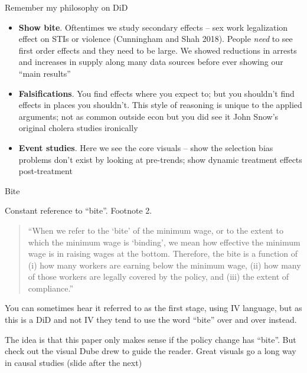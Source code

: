 \documentclass{beamer}
\begin{document}
\begin{frame}{Remember my philosophy on DiD}

\begin{itemize}
\item \textbf{Show bite}. Oftentimes we study secondary effects -- sex work legalization effect on STIs or violence (Cunningham and Shah 2018). People \emph{need} to see first order effects and they need to be large. We showed reductions in arrests and increases in supply along many data sources before ever showing our ``main results''
\item \textbf{Falsifications}. You find effects where you expect to; but you shouldn't find effects in places you shouldn't. This style of reasoning is unique to the applied arguments; not as common outside econ but you did see it John Snow's original cholera studies ironically
\item \textbf{Event studies}. Here we see the core visuals -- show the selection bias problems don't exist by looking at pre-trends; show dynamic treatment effects post-treatment
\end{itemize}

\end{frame}

\begin{frame}{Bite}

Constant reference to ``bite''.  Footnote 2.

\bigskip

\begin{quote}
``When we refer to the `bite' of the minimum wage, or to the extent to which the minimum wage is `binding', we mean how effective the minimum wage is in raising wages at the bottom.  Therefore, the bite is a function of (i) how many workers are earning below the minimum wage, (ii) how many of those workers are legally covered by the policy, and (iii) the extent of compliance.''
\end{quote}

\bigskip

You can sometimes hear it referred to as the first stage, using IV language, but as this is a DiD and not IV they tend to use the word ``bite'' over and over instead.

\bigskip

The idea is that this paper only makes sense if the policy change has ``bite''. But check out the visual Dube drew to guide the reader. Great visuals go a long way in causal studies (slide after the next)

\end{frame}
\end{document}
